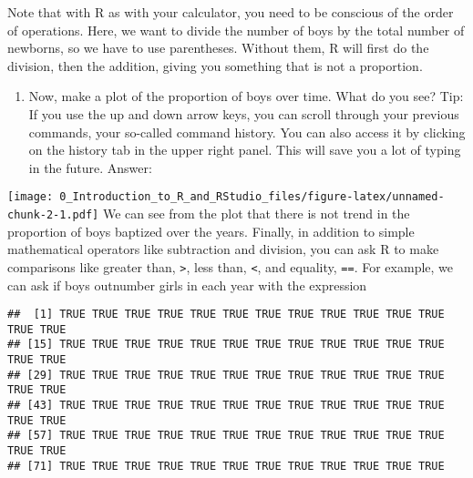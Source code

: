 \documentclass[]{article}
\newenvironment{Shaded}{\begin{snugshade}}{\end{snugshade}}
\newcommand{\KeywordTok}[1]{\textcolor[rgb]{0.13,0.29,0.53}{\textbf{#1}}}
\newcommand{\DataTypeTok}[1]{\textcolor[rgb]{0.13,0.29,0.53}{#1}}
\newcommand{\StringTok}[1]{\textcolor[rgb]{0.31,0.60,0.02}{#1}}
\newcommand{\OperatorTok}[1]{\textcolor[rgb]{0.81,0.36,0.00}{\textbf{#1}}}
\newcommand{\NormalTok}[1]{#1}
\providecommand{\tightlist}{%
  \setlength{\itemsep}{0pt}\setlength{\parskip}{0pt}}
\begin{document}
Note that with R as with your calculator, you need to be conscious of
the order of operations. Here, we want to divide the number of boys by
the total number of newborns, so we have to use parentheses. Without
them, R will first do the division, then the addition, giving you
something that is not a proportion.

\begin{enumerate}
\def\labelenumi{\arabic{enumi}.}
\setcounter{enumi}{2}
\tightlist
\item
  Now, make a plot of the proportion of boys over time. What do you see?
  Tip: If you use the up and down arrow keys, you can scroll through
  your previous commands, your so-called command history. You can also
  access it by clicking on the history tab in the upper right panel.
  This will save you a lot of typing in the future. Answer:
\end{enumerate}

\begin{Shaded}
\end{Shaded}

\texttt{[image: 0\_Introduction\_to\_R\_and\_RStudio\_files/figure-latex/unnamed-chunk-2-1.pdf]}
We can see from the plot that there is not trend in the proportion of
boys baptized over the years. Finally, in addition to simple
mathematical operators like subtraction and division, you can ask R to
make comparisons like greater than, \texttt{\textgreater{}}, less than,
\texttt{\textless{}}, and equality, \texttt{==}. For example, we can ask
if boys outnumber girls in each year with the expression

\begin{Shaded}
\end{Shaded}

\begin{verbatim}
##  [1] TRUE TRUE TRUE TRUE TRUE TRUE TRUE TRUE TRUE TRUE TRUE TRUE TRUE TRUE
## [15] TRUE TRUE TRUE TRUE TRUE TRUE TRUE TRUE TRUE TRUE TRUE TRUE TRUE TRUE
## [29] TRUE TRUE TRUE TRUE TRUE TRUE TRUE TRUE TRUE TRUE TRUE TRUE TRUE TRUE
## [43] TRUE TRUE TRUE TRUE TRUE TRUE TRUE TRUE TRUE TRUE TRUE TRUE TRUE TRUE
## [57] TRUE TRUE TRUE TRUE TRUE TRUE TRUE TRUE TRUE TRUE TRUE TRUE TRUE TRUE
## [71] TRUE TRUE TRUE TRUE TRUE TRUE TRUE TRUE TRUE TRUE TRUE TRUE
\end{verbatim}
\end{document}
